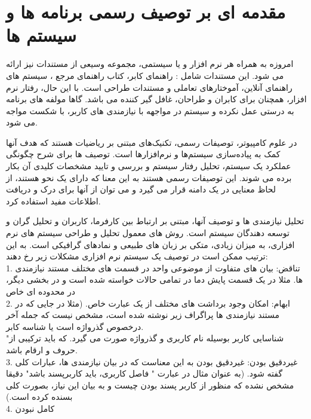 
\chapter{مقدمه ای بر توصیف رسمی برنامه ها و سیستم ها}\label{chapter1}
\paragraphfootnotes
امروزه به همراه هر نرم افزار و یا سیستمی، مجموعه وسیعی از مستندات نیز ارائه می شود. این مستندات شامل : راهنمای کابر، کتاب راهنمای مرجع 
، سیستم های راهنمای آنلاین، آموختارهای تعاملی
 و مستندات طراحی است. با این حال، رفتار نرم افزار، همچنان برای کابران و طراحان، غافل گیر کننده می باشد. گاها مولفه های برنامه به درستی عمل نکرده و سیستم در مواجهه با نیازمندی های کاربر، با شکست مواجه می شود.
 
 در علوم کامپیوتر، توصیفات رسمی، تکنیک‌های مبتنی بر ریاضیات هستند که هدف آنها کمک به پیاده‌سازی سیستم‌ها و نرم‌افزارها است. توصیف ها برای شرح چگونگی عملکرد یک سیستم، تحلیل رفتار سیستم و بررسی و تایید مشخصات کلیدی آن بکار برده می شوند. این توصیفات رسمی هستند به این معنا که دارای یک نحو هستند، از لحاظ معنایی در یک دامنه قرار می گیرد و می توان از آنها برای درک و دریافت اطلاعات مفید استفاده کرد.

تحلیل نیازمندی ها و توصیف آنها، مبتنی بر ارتباط بین کارفرما، کاربران و تحلیل گران و توسعه دهندگان سیستم است. روش های معمول تحلیل و طراحی سیستم های نرم افزاری، به میزان زیادی، متکی بر زبان های طبیعی و نمادهای گرافیکی است. به این ترتیب ممکن است در توصیف یک سیستم نرم افزاری مشکلات زیر رخ دهند:
\\
1. تناقض: بیان های متفاوت از موضوعی واحد در قسمت های مختلف مستند نیازمندی ها.
مثلا در یک قسمت پایش دما در تمامی حالات خواسته شده است و در بخشی دیگر، در محدوده ای خاص
\\
2.  ابهام: امکان وجود برداشت های مختلف از یک عبارت خاص.
(مثلا در جایی که در مستند نیازمندی ها پراگراف زیر نوشته شده است، مشخص نیست که جمله آخر درخصوص گذرواژه است یا شناسه کابر.
\\
"شناسایی کاربر بوسیله نام کاربری و گذرواژه صورت می گیرد. که باید ترکیبی از حروف و ارقام باشد.
\\
3. غیردقیق بودن: غیردقیق بودن به این معناست که در بیان نیازمندی ها، عبارات کلی گفته شود.
(به عنوان مثال در عبارت " فاصل کاربری، باید کاربرپسند باشد" دقیقا مشخص نشده که منظور از کاربر پسند بودن چیست و به بیان این نیاز، بصورت کلی بسنده کرده است.)
\\
4. کامل نبودن
\\


